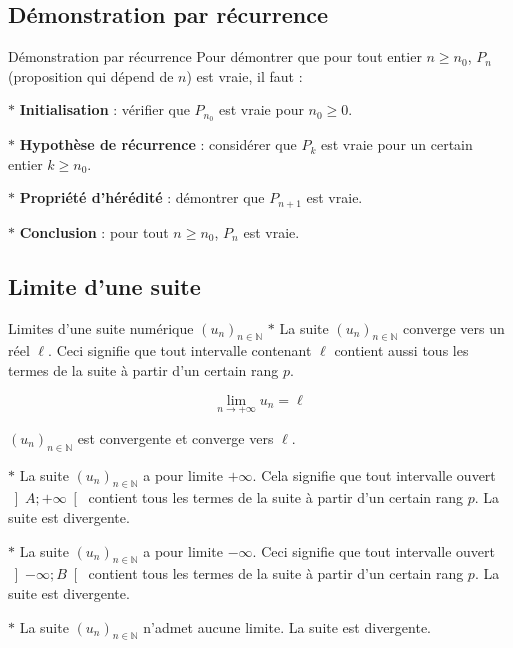 \subsection{Démonstration par récurrence}

\begin{bclogo}{Démonstration par récurrence}
Pour démontrer que pour tout entier $n\geqslant n_0$, $P_n$ (proposition qui dépend de $n$) est vraie, il faut :

\noindent
$\ast$ \textbf{Initialisation} : vérifier que $P_{n_0}$ est vraie pour $n_0\geqslant 0$.

\noindent
$\ast$ \textbf{Hypothèse de récurrence} : considérer que $P_k$ est vraie pour un certain entier $k\geqslant n_0$.

\noindent
$\ast$ \textbf{Propriété d'hérédité} : démontrer que $P_{n+1}$ est vraie.

\noindent
$\ast$ \textbf{Conclusion} : pour tout $n\geqslant n_0$, $P_n$ est vraie.
\end{bclogo}

\subsection{Limite d'une suite}

\begin{bclogo}{Limites d'une suite numérique $(u_n)_{n\in\mathbb{N}}$}
$\ast$ La suite $(u_n)_{n\in\mathbb{N}}$ converge vers un réel $\ell$. Ceci signifie que tout intervalle contenant $\ell$ contient aussi tous les termes de la suite à partir d'un certain rang $p$.

\[\lim\limits_{n \to +\infty} u_n=\ell \]

$(u_n)_{n\in\mathbb{N}}$ est convergente et converge vers $\ell$.

\noindent
$\ast$ La suite $(u_n)_{n\in\mathbb{N}}$ a pour limite $+\infty$. Cela signifie que tout intervalle ouvert $\left] A;+\infty\right[$ contient tous les termes de la suite à partir d'un certain rang $p$. La suite est divergente.

\noindent
$\ast$ La suite $(u_n)_{n\in\mathbb{N}}$ a pour limite $-\infty$. Ceci signifie que tout intervalle ouvert $\left] -\infty ;B\right[ $ contient tous les termes de la suite à partir d'un certain rang $p$. La suite est divergente.

\noindent
$\ast$ La suite $(u_n)_{n\in\mathbb{N}}$ n'admet aucune limite. La suite est divergente.
\end{bclogo}

